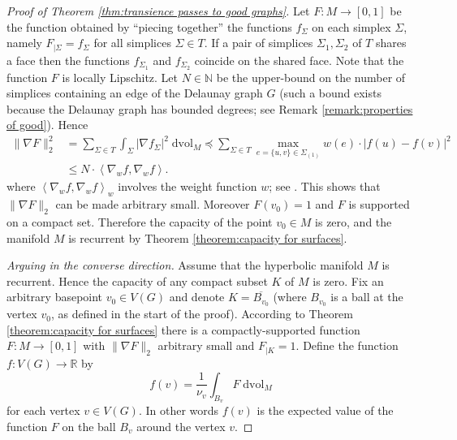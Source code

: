 \documentclass{amsart}
\newcommand{\RR}{\mathbb{R}}
\newcommand{\NN}{\mathbb{N}}
\newcommand{\vol}{\mathrm{vol}}
\theoremstyle{plain}
\numberwithin{equation}{section}
\theoremstyle{definition}
\begin{document}
\begin{proof}[Proof of Theorem \ref{thm:transience passes to good graphs}]
Let $F : M \to \left[0,1 \right]$ be the function obtained by \enquote{piecing together} the functions $f_\Sigma$ on each simplex $\Sigma$, namely $F_{|\Sigma} = f_\Sigma$ for all simplices $\Sigma \in T$. If a pair of  simplices $\Sigma_1, \Sigma_2$ of $T$ shares a face then the  functions $f_{\Sigma_1}$ and $f_{\Sigma_2}$ coincide on the shared face. Note that the function $F$ is locally Lipschitz. Let $N \in \NN$ be the upper-bound on the number of simplices containing an edge of the Delaunay graph $G$ (such a bound exists because the Delaunay graph has bounded degrees; see Remark \ref{remark:properties of good}). %
Hence
\begin{align*}\|\nabla F\|_2^2&= \sum_{\Sigma\in T}\int_\Sigma|\nabla f_\Sigma|^2 \; \mathrm{d} \vol_M 
    \preceq  \sum_{\Sigma\in T}  \max_{e=\{u,v\} \in \Sigma_{(1)}} w(e)\cdot | f(u)-f(v)|^2\\
    &\le  N \cdot \left<\nabla_w f,\nabla_w f\right>.
    \end{align*}
where $\left<\nabla_w f,\nabla_w f\right>_w$ involves  the weight function $w$; see .
This shows that  $\|\nabla F\|_2$ can be made arbitrary small. Moreover $F(v_0) = 1$ and $F$ is supported on a compact set. Therefore the capacity of the point $v_0 \in M$ is zero, and  the manifold $M$ is recurrent by Theorem \ref{theorem:capacity for surfaces}. 

\emph{Arguing in the converse direction.} 
Assume that the hyperbolic manifold $M$ is recurrent. Hence the capacity of any compact subset $K$ of $M$ is zero.
Fix an arbitrary basepoint $v_0 \in V(G)$ and denote $K = \overline{ B_{v_0}}$ (where $B_{v_0}$ is a ball at the vertex $v_0$, as defined in the start of the proof).
According to Theorem \ref{theorem:capacity for surfaces} there is a compactly-supported function $F : M \to \left[0,1\right]$ with $\|\nabla F\|_2$ arbitrary small and $F_{|K} = 1$. 
Define the function $f : V(G) \to \RR$  by
$$ f(v) = \frac{1}{\nu_v} \int_{B_v} F \; \mathrm{dvol}_{M}$$
for each vertex $v \in V(G)$.
In other words $f(v)$ is the expected value of the function $F$ on the ball $B_v$ around the vertex $v$.


\end{proof}
\end{document}
